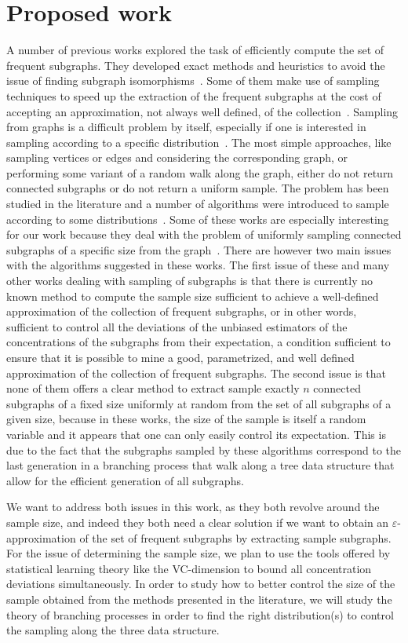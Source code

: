 \section{Proposed work}\label{sec:graphimineproposal}
A number of previous works explored the task of efficiently compute the set of
frequent subgraphs. They developed exact methods and heuristics to avoid the
issue of finding subgraph
isomorphisms~\citep{BaskervilleP06,GrochowK07,OmidiSMN09}. Some of them make use
of sampling techniques to speed up the extraction of the frequent subgraphs at
the cost of accepting an approximation, not always well defined, of the
collection~\cite{KashtanIMA04}. Sampling from graphs is a difficult problem by
itself, especially if one is interested in sampling according to a specific
distribution~\citep{LeskovecF06,ZouH10}. The most simple approaches, like
sampling vertices or edges and considering the corresponding graph, or
performing some variant of a random walk along the graph, either do not return
connected subgraphs or do not return a uniform sample. The problem has been
studied in the literature and a number of algorithms were introduced to sample
according to some distributions~\citep{LeeXE12}. Some of these works are
especially interesting for our work because they deal with the problem of
uniformly sampling connected subgraphs of a specific size from the
graph~\citep{Wernicke06,RibeiroS10,LuB12}. There are however two main issues
with the algorithms suggested in these works. The first issue of these and many
other works dealing with sampling of subgraphs is that there is currently no
known method to compute the sample size sufficient to achieve a well-defined
approximation of the collection of frequent subgraphs, or in other words,
sufficient to control all the deviations of the unbiased estimators of the
concentrations of the subgraphs from their expectation, a condition sufficient
to ensure that it is possible to mine a good, parametrized, and well defined
approximation of the collection of frequent subgraphs. The second issue is that
none of them offers a clear method to extract sample exactly $n$ connected
subgraphs of a fixed size uniformly at random from the set of all subgraphs of a
given size, because in these works, the size of the sample is itself a random
variable and it appears that one can only easily control its expectation. This
is due to the fact that the subgraphs sampled by these algorithms correspond to
the last generation in a branching process that walk along a tree data structure
that allow for the efficient generation of all subgraphs. 

We want to address both issues in this work, as they both revolve around the
sample size, and indeed they both need a clear solution if we want to obtain an
$\varepsilon$-approximation of the set of frequent subgraphs by extracting
sample subgraphs. For the issue of determining the sample size, we plan to use
the tools offered by statistical learning theory like the VC-dimension to bound
all concentration deviations simultaneously. In order to study how to better
control the size of the sample obtained from the methods presented in the
literature, we will study the theory of branching processes in order to find the
right distribution(s) to control the sampling along the three data structure.

